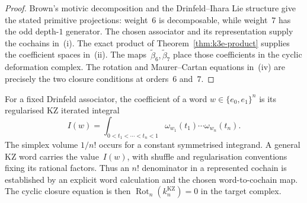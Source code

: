 \begin{proof}
Brown's motivic decomposition and the Drinfeld--Ihara Lie structure
give the stated primitive projections: weight~$6$ is decomposable,
while weight~$7$ has the odd depth-$1$ generator.  The chosen
associator and its representation supply the cochains in~(i).
The exact product of Theorem~\ref{thm:k3e-product} supplies the
coefficient spaces in~(ii).  The maps~$\widetilde\beta_6,
\widetilde\beta_7$ place those
coefficients in the cyclic deformation complex.  The rotation and
Maurer--Cartan equations in~(iv) are precisely the two closure
conditions at orders~$6$ and~$7$.
\end{proof}

\begin{remark}
\label{rem:cycainf-denom-nfactorial-verification}
For a fixed Drinfeld associator, the coefficient of a word
$w\in\{e_0,e_1\}^n$ is its regularised KZ iterated integral
\[
 I(w)=\int_{0<t_1<\cdots<t_n<1}
       \omega_{w_1}(t_1)\cdots\omega_{w_n}(t_n).
\]
The simplex volume $1/n!$ occurs for a constant symmetrised
integrand.  A general KZ word carries the value~$I(w)$, with shuffle
and regularisation conventions fixing its rational factors.  Thus an
$n!$ denominator in a represented cochain is established by an
explicit word calculation and the chosen word-to-cochain map.  The
cyclic closure equation is then
$\operatorname{Rot}_n(k_n^{\mathrm{KZ}})=0$ in the target complex.
\end{remark}

